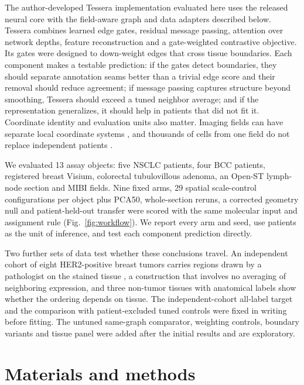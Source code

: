 \documentclass[11pt]{article}
\begin{document}
The author-developed Tessera implementation evaluated here uses the released neural core with the field-aware graph and data adapters described below. Tessera combines learned edge gates, residual message passing, attention over network depths, feature reconstruction and a gate-weighted contrastive objective. Its gates were designed to down-weight edges that cross tissue boundaries. Each component makes a testable prediction: if the gates detect boundaries, they should separate annotation seams better than a trivial edge score and their removal should reduce agreement; if message passing captures structure beyond smoothing, Tessera should exceed a tuned neighbor average; and if the representation generalizes, it should help in patients that did not fit it. Coordinate identity and evaluation units also matter. Imaging fields can have separate local coordinate systems \citep{palla2022squidpy,yan2026alignment}, and thousands of cells from one field do not replace independent patients \citep{zimmerman2021pseudoreplication,roberts2017crossvalidation}.

We evaluated 13 assay objects: five NSCLC patients, four BCC patients, registered breast Visium, colorectal tubulovillous adenoma, an Open-ST lymph-node section and MIBI fields. Nine fixed arms, 29 spatial scale-control configurations per object plus PCA50, whole-section reruns, a corrected geometry null and patient-held-out transfer were scored with the same molecular input and assignment rule (Fig.~\ref{fig:workflow}). We report every arm and seed, use patients as the unit of inference, and test each component prediction directly.

Two further sets of data test whether these conclusions travel. An independent cohort of eight HER2-positive breast tumors carries regions drawn by a pathologist on the stained tissue \citep{andersson2021her2st}, a construction that involves no averaging of neighboring expression, and three non-tumor tissues with anatomical labels \citep{maynard2021dlpfc,wang2018starmap,moffitt2018merfish} show whether the ordering depends on tissue. The independent-cohort all-label target and the comparison with patient-excluded tuned controls were fixed in writing before fitting. The untuned same-graph comparator, weighting controls, boundary variants and tissue panel were added after the initial results and are exploratory.



\section{Materials and methods}
\end{document}
